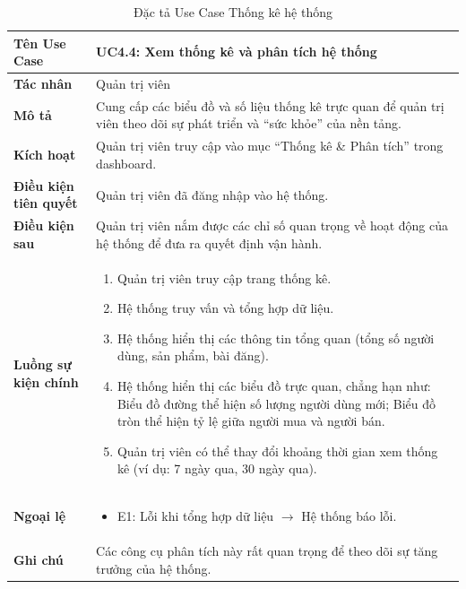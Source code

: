 \begin{table}[H]
\centering
\begin{tabularx}{\textwidth}{|l|X|}
\hline
\textbf{Tên Use Case} & \textbf{UC4.4: Xem thống kê và phân tích hệ thống} \\ \hline
\textbf{Tác nhân} & Quản trị viên \\ \hline
\textbf{Mô tả} & Cung cấp các biểu đồ và số liệu thống kê trực quan để quản trị viên theo dõi sự phát triển và ``sức khỏe'' của nền tảng. \\ \hline
\textbf{Kích hoạt} & Quản trị viên truy cập vào mục ``Thống kê \& Phân tích'' trong dashboard. \\ \hline
\textbf{Điều kiện tiên quyết} & Quản trị viên đã đăng nhập vào hệ thống. \\ \hline
\textbf{Điều kiện sau} & Quản trị viên nắm được các chỉ số quan trọng về hoạt động của hệ thống để đưa ra quyết định vận hành. \\ \hline
\textbf{Luồng sự kiện chính} & 
\begin{enumerate}
    \item Quản trị viên truy cập trang thống kê.
    \item Hệ thống truy vấn và tổng hợp dữ liệu.
    \item Hệ thống hiển thị các thông tin tổng quan (tổng số người dùng, sản phẩm, bài đăng).
    \item Hệ thống hiển thị các biểu đồ trực quan, chẳng hạn như: Biểu đồ đường thể hiện số lượng người dùng mới; Biểu đồ tròn thể hiện tỷ lệ giữa người mua và người bán.
    \item Quản trị viên có thể thay đổi khoảng thời gian xem thống kê (ví dụ: 7 ngày qua, 30 ngày qua).
\end{enumerate} \\ \hline
\textbf{Ngoại lệ} & 
\begin{itemize}
    \item E1: Lỗi khi tổng hợp dữ liệu $\rightarrow$ Hệ thống báo lỗi.
\end{itemize} \\ \hline
\textbf{Ghi chú} & Các công cụ phân tích này rất quan trọng để theo dõi sự tăng trưởng của hệ thống. \\ \hline
\end{tabularx}
\caption{Đặc tả Use Case Thống kê hệ thống}
\end{table}